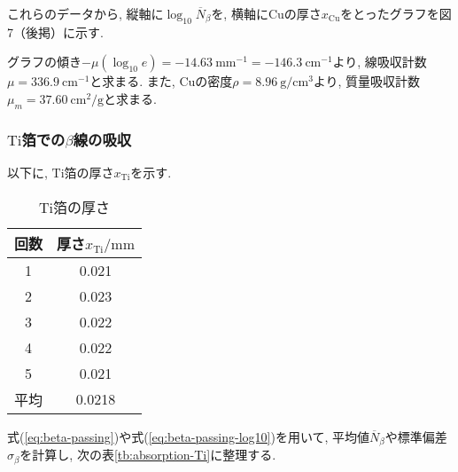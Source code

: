 \documentclass{jarticle}
\begin{document}
これらのデータから, 縦軸に$\log_{10}\overline{N}_\beta$を, 横軸に$\mathrm{Cu}$の厚さ$x_\mathrm{Cu}$をとったグラフを図7（後掲）に示す.


グラフの傾き$-\mu(\log_{10}e)=-14.63\ \mathrm{mm}^{-1}=-146.3\ \mathrm{cm}^{-1}$より, 線吸収計数$\mu=336.9\ \mathrm{cm}^{-1}$と求まる.
また, $\mathrm{Cu}$の密度$\rho=8.96\ \mathrm{g}/\mathrm{cm}^3$\cite{金属の密度}より, 質量吸収計数$\mu_m=37.60\ \mathrm{cm}^2/\mathrm{g}$と求まる.


\subsubsection{$\mathrm{Ti}$箔での$\beta$線の吸収}

以下に, $\mathrm{Ti}$箔の厚さ$x_\mathrm{Ti}$を示す.

\begin{table}[H]
  \centering
  \caption{$\mathrm{Ti}$箔の厚さ}
  \label{tb:Ti-foil-thickness}
  \begin{tabular}{cc}
    \hline
    回数 & 厚さ$x_\mathrm{Ti}/\mathrm{mm}$ \\
    \hline
    1 & 0.021 \\
    2 & 0.023 \\
    3 & 0.022 \\
    4 & 0.022 \\
    5 & 0.021 \\
    \hline
    平均 & 0.0218 \\
    \hline
  \end{tabular}
\end{table}

式(\ref{eq:beta-passing})や式(\ref{eq:beta-passing-log10})を用いて, 平均値$\overline{N}_\beta$や標準偏差$\sigma_\beta$を計算し, 次の表\ref{tb:absorption-Ti}に整理する.
\end{document}
